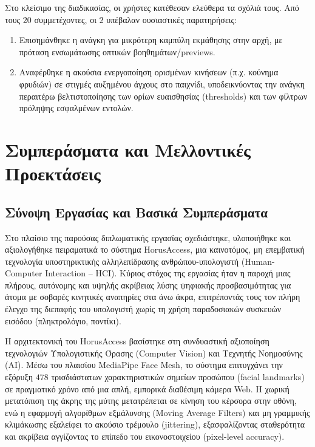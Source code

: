 \documentclass[twoside, a4paper, 11pt]{article}
\newcommand{\textlatin}[1]{\textenglish{#1}}
\begin{document}
Στο κλείσιμο της διαδικασίας, οι χρήστες κατέθεσαν ελεύθερα τα σχόλιά τους. Από τους $20$ συμμετέχοντες, οι $2$ υπέβαλαν ουσιαστικές παρατηρήσεις:

\begin{enumerate}
    \item Επισημάνθηκε η ανάγκη για μικρότερη καμπύλη εκμάθησης στην αρχή, με πρόταση ενσωμάτωσης οπτικών βοηθημάτων/\textlatin{previews}.
    \item Αναφέρθηκε η ακούσια ενεργοποίηση ορισμένων κινήσεων (π.χ. κούνημα φρυδιών) σε στιγμές αυξημένου άγχους στο παιχνίδι, υποδεικνύοντας την ανάγκη περαιτέρω βελτιστοποίησης των ορίων ευαισθησίας (\textlatin{thresholds}) και των φίλτρων πρόληψης εσφαλμένων εντολών.
\end{enumerate}

\clearpage
\section{Συμπεράσματα και Μελλοντικές Προεκτάσεις}
\subsection{Σύνοψη Εργασίας και Βασικά Συμπεράσματα}

Στο πλαίσιο της παρούσας διπλωματικής εργασίας σχεδιάστηκε, υλοποιήθηκε και αξιολογήθηκε πειραματικά το σύστημα HorusAccess, μια καινοτόμος, μη επεμβατική τεχνολογία υποστηρικτικής αλληλεπίδρασης ανθρώπου-υπολογιστή (Human-Computer Interaction -- HCI). Κύριος στόχος της εργασίας ήταν η παροχή μιας πλήρους, αυτόνομης και υψηλής ακρίβειας λύσης ψηφιακής προσβασιμότητας για άτομα με σοβαρές κινητικές αναπηρίες στα άνω άκρα, επιτρέποντάς τους τον πλήρη έλεγχο της διεπαφής του υπολογιστή χωρίς τη χρήση παραδοσιακών συσκευών εισόδου (πληκτρολόγιο, ποντίκι).

Η αρχιτεκτονική του HorusAccess βασίστηκε στη συνδυαστική αξιοποίηση τεχνολογιών Υπολογιστικής Όρασης (Computer Vision) και Τεχνητής Νοημοσύνης (AI). Μέσω του πλαισίου MediaPipe Face Mesh, το σύστημα επιτυγχάνει την εξόρυξη $478$ τρισδιάστατων χαρακτηριστικών σημείων προσώπου (facial landmarks) σε πραγματικό χρόνο από μια απλή, εμπορικά διαθέσιμη κάμερα Web. Η χωρική μετατόπιση της άκρης της μύτης μετατρέπεται σε κίνηση του κέρσορα στην οθόνη, ενώ η εφαρμογή αλγορίθμων εξμάλυνσης (Moving Average Filters) και μη γραμμικής κλιμάκωσης εξαλείφει το ακούσιο τρέμουλο (jittering), εξασφαλίζοντας σταθερότητα και ακρίβεια αγγίζοντας το επίπεδο του εικονοστοιχείου (pixel-level accuracy).
\end{document}
